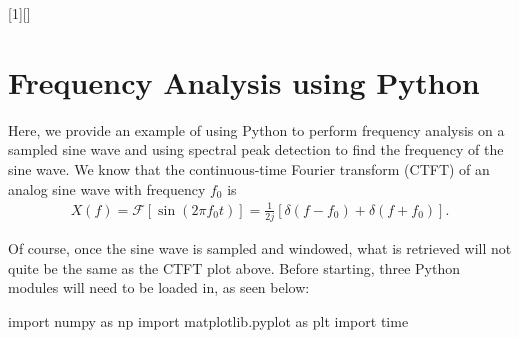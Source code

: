 \documentclass{report}
\begin{document}
\setcounter{chapter}{7}
\setcounter{section}{6}
\setcounter{page}{93}

[1][]{\lstset{style=mypython,#1}}{}

\section{Frequency Analysis using Python}
Here, we provide an example of using Python to perform frequency analysis on a sampled sine wave and using spectral peak detection 
to find the frequency of the sine wave. We know that the continuous-time Fourier transform (CTFT) of an analog sine wave with frequency $f_0$ is 
\begin{align*}
    X(f) = \mathcal{F}[\sin(2\pi f_0 t)] = \frac{1}{2j}[\delta(f-f_0)+\delta(f+f_0)].
\end{align*}
\begin{center}
\end{center}
Of course, once the sine wave is sampled and windowed, what is retrieved will not quite be the same as the CTFT plot above. 
Before starting, three Python modules will need to be loaded in, as seen below:

\begin{mypython}
import numpy as np
import matplotlib.pyplot as plt
import time
\end{mypython}
\end{document}
